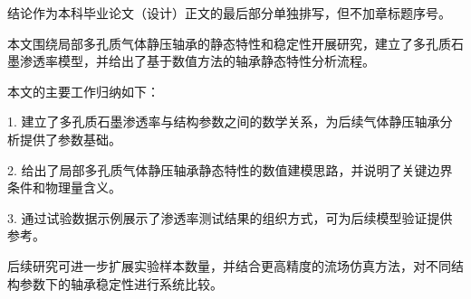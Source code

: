 \begin{conclusions}

结论作为本科毕业论文（设计）正文的最后部分单独排写，但不加章标题序号。

本文围绕局部多孔质气体静压轴承的静态特性和稳定性开展研究，建立了多孔质石墨渗透率模型，并给出了基于数值方法的轴承静态特性分析流程。

本文的主要工作归纳如下：

1. 建立了多孔质石墨渗透率与结构参数之间的数学关系，为后续气体静压轴承分析提供了参数基础。

2. 给出了局部多孔质气体静压轴承静态特性的数值建模思路，并说明了关键边界条件和物理量含义。

3. 通过试验数据示例展示了渗透率测试结果的组织方式，可为后续模型验证提供参考。

后续研究可进一步扩展实验样本数量，并结合更高精度的流场仿真方法，对不同结构参数下的轴承稳定性进行系统比较。

\end{conclusions}
